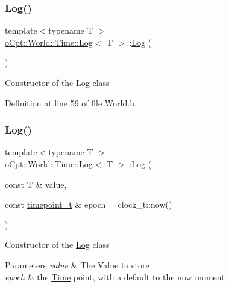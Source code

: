 \subsubsection{\texorpdfstring{Log()}{Log()}\hspace{0.1cm}{\footnotesize\ttfamily [1/2]}}
{\footnotesize\ttfamily template$<$typename T $>$ \\
\hyperlink{classo_cpt_1_1_world_1_1_time_1_1_log}{o\+Cpt\+::\+World\+::\+Time\+::\+Log}$<$ T $>$\+::\hyperlink{classo_cpt_1_1_world_1_1_time_1_1_log}{Log} (\begin{DoxyParamCaption}{ }\end{DoxyParamCaption})\hspace{0.3cm}{\ttfamily [inline]}}

Constructor of the \hyperlink{classo_cpt_1_1_world_1_1_time_1_1_log}{Log} class 

Definition at line 59 of file World.\+h.

\hypertarget{classo_cpt_1_1_world_1_1_time_1_1_log_aa404e83afcd8ab1f52d58cf4fb8c8972}{}\label{classo_cpt_1_1_world_1_1_time_1_1_log_aa404e83afcd8ab1f52d58cf4fb8c8972} 
\subsubsection{\texorpdfstring{Log()}{Log()}\hspace{0.1cm}{\footnotesize\ttfamily [2/2]}}
{\footnotesize\ttfamily template$<$typename T $>$ \\
\hyperlink{classo_cpt_1_1_world_1_1_time_1_1_log}{o\+Cpt\+::\+World\+::\+Time\+::\+Log}$<$ T $>$\+::\hyperlink{classo_cpt_1_1_world_1_1_time_1_1_log}{Log} (\begin{DoxyParamCaption}\item[{const T \&}]{value,  }\item[{const \hyperlink{classo_cpt_1_1_world_1_1_time_a6a6e782c3c90622c1c7070b0a223ec4c}{timepoint\+\_\+t} \&}]{epoch = {\ttfamily clock\+\_\+t\+:\+:now()} }\end{DoxyParamCaption})\hspace{0.3cm}{\ttfamily [inline]}}

Constructor of the \hyperlink{classo_cpt_1_1_world_1_1_time_1_1_log}{Log} class 
\begin{DoxyParams}{Parameters}
{\em value} & The Value to store \\
\hline
{\em epoch} & the \hyperlink{classo_cpt_1_1_world_1_1_time}{Time} point, with a default to the now moment \\
\hline
\end{DoxyParams}



